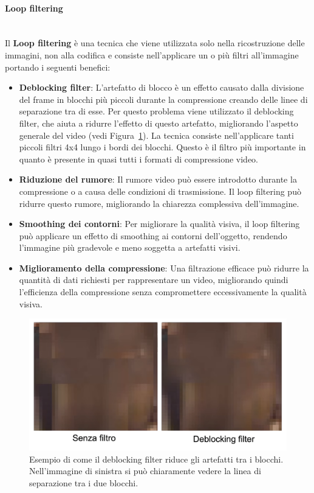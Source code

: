 \documentclass[a4paper,12pt, oneside]{article}
\begin{document}
\paragraph{Loop filtering}\hphantom{A}\\
Il \textbf{Loop filtering} è una tecnica che viene utilizzata solo nella ricostruzione delle immagini,
non alla codifica e consiste nell'applicare un o più filtri all'immagine portando i seguenti benefici:

\begin{itemize}
    \item \textbf{Deblocking filter}: L'artefatto di blocco è un effetto causato dalla divisione del frame
    in blocchi più piccoli durante la compressione creando delle linee di separazione tra di esse.
    Per questo problema viene utilizzato il deblocking filter, che aiuta a ridurre l'effetto di questo
    artefatto, migliorando l'aspetto generale del video (vedi Figura~\ref{fig:deblocking_filter}). La
    tecnica consiste nell'applicare tanti piccoli filtri 4x4 lungo i bordi dei blocchi.
    Questo è il filtro più importante in quanto è presente in quasi tutti i formati di compressione video.
    \item \textbf{Riduzione del rumore}: Il rumore video può essere introdotto durante la compressione
    o a causa delle condizioni di trasmissione. Il loop filtering può ridurre questo rumore,
    migliorando la chiarezza complessiva dell'immagine.
    \item \textbf{Smoothing dei contorni}: Per migliorare la qualità visiva, il loop filtering può
    applicare un effetto di smoothing ai contorni dell'oggetto, rendendo l'immagine più gradevole e
    meno soggetta a artefatti visivi.
    \item \textbf{Miglioramento della compressione}: Una filtrazione efficace può ridurre la quantità
    di dati richiesti per rappresentare un video, migliorando quindi l'efficienza della compressione
    senza compromettere eccessivamente la qualità visiva.
\end{itemize}

\begin{figure}[h]
    \centering
    \includegraphics[width=1\textwidth]{images/deblocking-filter.png}
    \caption{Esempio di come il deblocking filter riduce gli artefatti tra i blocchi. Nell'immagine di
    sinistra si può chiaramente vedere la linea di separazione tra i due blocchi.}
    \label{fig:deblocking_filter}
\end{figure}
\end{document}
